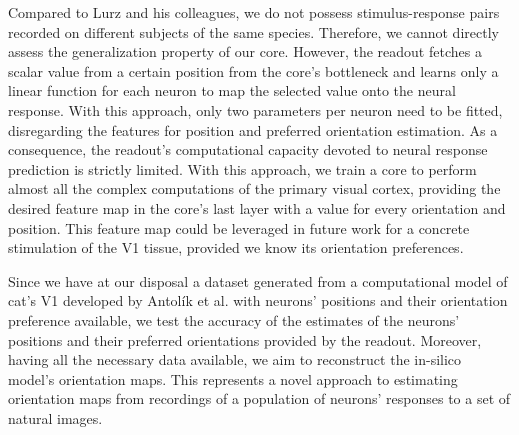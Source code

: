 Compared to Lurz and his colleagues, we do not possess stimulus-response pairs recorded on different subjects of the same species. Therefore, we cannot directly assess the generalization property of our core. However, the readout fetches a scalar value from a certain position from the core’s bottleneck and learns only a linear function for each neuron to map the selected value onto the neural response. With this approach, only two parameters per neuron need to be fitted, disregarding the features for position and preferred orientation estimation. As a consequence, the readout’s computational capacity devoted to neural response prediction is strictly limited. With this approach, we train a core to perform almost all the complex computations of the primary visual cortex, providing the desired feature map in the core’s last layer with a value for every orientation and position. This feature map could be leveraged in future work for a concrete stimulation of the V1 tissue, provided we know its orientation preferences.


Since we have at our disposal a dataset generated from a computational model of cat’s V1 developed by Antolík et al. \citep{antolik2019comprehensive} with neurons’ positions and their orientation preference available, we test the accuracy of the estimates of the neurons’ positions and their preferred orientations provided by the readout. Moreover, having all the necessary data available, we aim to reconstruct the in-silico model’s orientation maps. This represents a novel approach to estimating orientation maps from recordings of a population of neurons' responses to a set of natural images.
